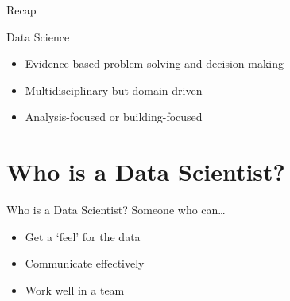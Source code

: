 \begin{frame}{Recap}
    \begin{block}{Data Science}
        \begin{itemize}
            \setlength{\itemsep}{0.75em}
            \item \alert{Evidence\hyp{}based problem solving and
                         decision\hyp{}making}
            \item Multidisciplinary but domain\hyp{}driven
            \item Analysis\hyp{}focused or building\hyp{}focused
        \end{itemize}
    \end{block}
\end{frame}

\section{Who is a Data Scientist?}

\begin{frame}{Who is a Data Scientist?}
    Someone who can\ldots
    \begin{itemize}
        \setlength{\itemsep}{0.75em}
        \item Get a `feel' for the data
        \item Communicate effectively
        \item Work well in a team
    \end{itemize}
\end{frame}

